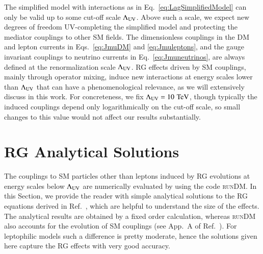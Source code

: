 \documentclass[final,5p,twocolumn]{elsarticle}
\newcommand{\Eq}[1]{Eq.~\eqref{#1}}
\newcommand{\Eqs}[2]{Eqs.~\eqref{#1} and \eqref{#2}}
\newcommand{\Ref}[1]{Ref.~\cite{#1}}
\newcommand{\runDM}{\textsc{runDM}\xspace}
\begin{document}
The simplified model with interactions as in \Eq{eq:LagSimplifiedModel} can only be valid up to some cut-off scale $\Lambda_{\rm UV}$. Above such a scale, we expect new degrees of freedom UV-completing the simplified model and protecting the mediator couplings to other SM fields. The dimensionless couplings in the DM and lepton currents in \Eqs{eq:JmuDM}{eq:Jmuleptons}, and the gauge invariant couplings to neutrino currents in \Eq{eq:Jmuneutrinos}, are always defined at the renormalization scale $\Lambda_{\rm UV}$. RG effects driven by SM couplings, mainly through operator mixing, induce new interactions at energy scales lower than $\Lambda_{\rm UV}$ that can have a phenomenological relevance, as we will extensively discuss in this work. For concreteness, we fix $\Lambda_{\rm UV} = 10 \,\,\mathrm{TeV}$, though typically the induced couplings depend only logarithmically on the cut-off scale, so small changes to this value would not affect our results substantially.

\section{RG Analytical Solutions}
\label{sec:RGE}

The couplings to SM particles other than leptons induced by RG evolutions at energy scales below $\Lambda_{\rm UV}$ are numerically evaluated by using the code \runDM. In this Section, we provide the reader with simple analytical solutions to the RG equations derived in Ref.~\cite{D'Eramo:2014aba}, which are helpful to understand the size of the effects. The analytical results are obtained by a fixed order calculation, whereas \runDM also accounts for the evolution of SM couplings (see App.~A of \Ref{D'Eramo:2016atc}). For leptophilic models such a difference is pretty moderate, hence the solutions given here capture the RG effects with very good accuracy. 
\end{document}
